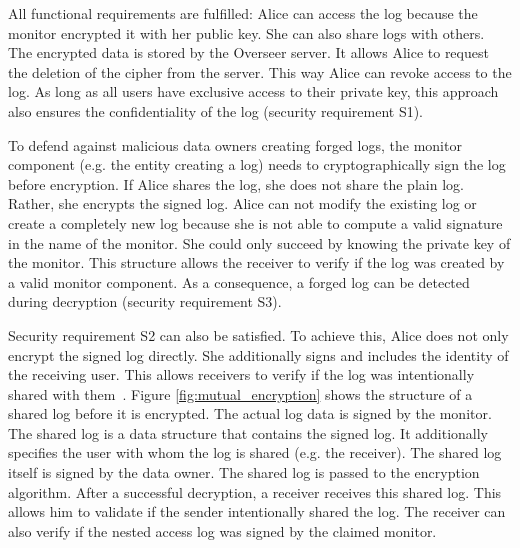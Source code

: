 \documentclass[../main.tex]{subfiles}
\begin{document}
All functional requirements are fulfilled:
Alice can access the log because the monitor encrypted it with her public key.
She can also share logs with others.
The encrypted data is stored by the Overseer server.
It allows Alice to request the deletion of the cipher from the server.
This way Alice can revoke access to the log.
As long as all users have exclusive access to their private key, this approach also ensures the confidentiality of the log (security requirement S1).

To defend against malicious data owners creating forged logs, the monitor component (e.g. the entity creating a log) needs to cryptographically sign the log before encryption.
If Alice shares the log, she does not share the plain log.
Rather, she encrypts the signed log.
Alice can not modify the existing log or create a completely new log because she is not able to compute a valid signature in the name of the monitor.
She could only succeed by knowing the private key of the monitor.
This structure allows the receiver to verify if the log was created by a valid monitor component.
As a consequence, a forged log can be detected during decryption (security requirement S3).

Security requirement S2 can also be satisfied.
To achieve this, Alice does not only encrypt the signed log directly.
She additionally signs and includes the identity of the receiving user.
This allows receivers to verify if the log was intentionally shared with them~\cite{Davis2001}.
Figure \ref{fig:mutual_encryption} shows the structure of a shared log before it is encrypted.
The actual log data is signed by the monitor.
The shared log is a data structure that contains the signed log.
It additionally specifies the user with whom the log is shared (e.g. the receiver).
The shared log itself is signed by the data owner.
The shared log is passed to the encryption algorithm.
After a successful decryption, a receiver receives this shared log.
This allows him to validate if the sender intentionally shared the log.
The receiver can also verify if the nested access log was signed by the claimed monitor.
\end{document}
